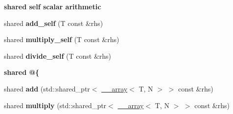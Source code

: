 \begin{Indent}{\bf shared self scalar arithmetic}\par
{\em \label{_amgrp39886a4931184ad2091cad99cafe00de}
 }\begin{DoxyCompactItemize}
\item 
\hypertarget{class____array_a6ac3f286d87cf856e47b5e3cd4bceaf5}{
shared {\bfseries add\_\-self} (T const \&rhs)}
\label{class____array_a6ac3f286d87cf856e47b5e3cd4bceaf5}

\item 
\hypertarget{class____array_a87ee1d56dc650d1cc15fc4a17e29a2ff}{
shared {\bfseries multiply\_\-self} (T const \&rhs)}
\label{class____array_a87ee1d56dc650d1cc15fc4a17e29a2ff}

\item 
\hypertarget{class____array_a082fa2c88f43930d0138e9ccd383e59b}{
shared {\bfseries divide\_\-self} (T const \&rhs)}
\label{class____array_a082fa2c88f43930d0138e9ccd383e59b}

\end{DoxyCompactItemize}
\end{Indent}
\begin{Indent}{\bf shared @\{}\par
{\em \label{_amgrpd7747f34a02ed4bfc358438fccf29bd2}
 }\begin{DoxyCompactItemize}
\item 
\hypertarget{class____array_ab20b7f53c81ac31b349d31bc58e650f6}{
shared {\bfseries add} (std::shared\_\-ptr$<$ \hyperlink{class____array}{\_\-\_\-array}$<$ T, N $>$ $>$ const \&rhs)}
\label{class____array_ab20b7f53c81ac31b349d31bc58e650f6}

\item 
\hypertarget{class____array_a35d7cfec43ce9f395f148b64a6083a69}{
shared {\bfseries multiply} (std::shared\_\-ptr$<$ \hyperlink{class____array}{\_\-\_\-array}$<$ T, N $>$ $>$ const \&rhs)}
\label{class____array_a35d7cfec43ce9f395f148b64a6083a69}

\end{DoxyCompactItemize}
\end{Indent}
